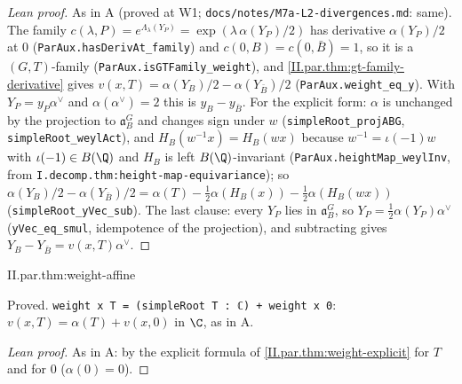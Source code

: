 \begin{proof}[Lean proof]
As in A (proved at W1; \texttt{docs/notes/M7a-L2-divergences.md}: same). The family $c(\lambda,P)=e^{\Lambda_\lambda(Y_P)}=\exp(\lambda\,\alpha(Y_P)/2)$ has derivative $\alpha(Y_P)/2$ at $0$ (\texttt{ParAux.hasDerivAt\_family}) and $c(0,B)=c(0,\bar B)=1$, so it is a $(G,T)$-family (\texttt{ParAux.isGTFamily\_weight}), and \cref{II.par.thm:gt-family-derivative} gives $v(x,T)=\alpha(Y_B)/2-\alpha(Y_{\bar B})/2$ (\texttt{ParAux.weight\_eq\_y}). With $Y_P=y_P\alpha^\vee$ and $\alpha(\alpha^\vee)=2$ this is $y_B-y_{\bar B}$. For the explicit form: $\alpha$ is unchanged by the projection to $\mathfrak a_B^G$ and changes sign under $w$ (\texttt{simpleRoot\_projABG}, \texttt{simpleRoot\_weylAct}), and $H_B(w^{-1}x)=H_B(wx)$ because $w^{-1}=\iota(-1)w$ with $\iota(-1)\in B(\Q)$ and $H_B$ is left $B(\Q)$-invariant (\texttt{ParAux.heightMap\_weylInv}, from \texttt{I.decomp.thm:height-map-equivariance}); so $\alpha(Y_B)/2-\alpha(Y_{\bar B})/2=\alpha(T)-\tfrac12\alpha(H_B(x))-\tfrac12\alpha(H_B(wx))$ (\texttt{simpleRoot\_yVec\_sub}). The last clause: every $Y_P$ lies in $\mathfrak a_B^G$, so $Y_P=\tfrac12\alpha(Y_P)\alpha^\vee$ (\texttt{yVec\_eq\_smul}, idempotence of the projection), and subtracting gives $Y_B-Y_{\bar B}=v(x,T)\alpha^\vee$.
\end{proof}

\begin{theorem}[$v$ is affine in $T$]
\end{theorem}
\begin{tfformal}{II.par.thm:weight-affine}
\begin{tffidelity}
Proved. \texttt{weight x T = (simpleRoot T : ℂ) + weight x 0}: $v(x,T)=\alpha(T)+v(x,0)$ in $\C$, as in A.
\end{tffidelity}
\end{tfformal}
\begin{proof}[Lean proof]
As in A: by the explicit formula of \cref{II.par.thm:weight-explicit} for $T$ and for $0$ ($\alpha(0)=0$).
\end{proof}

